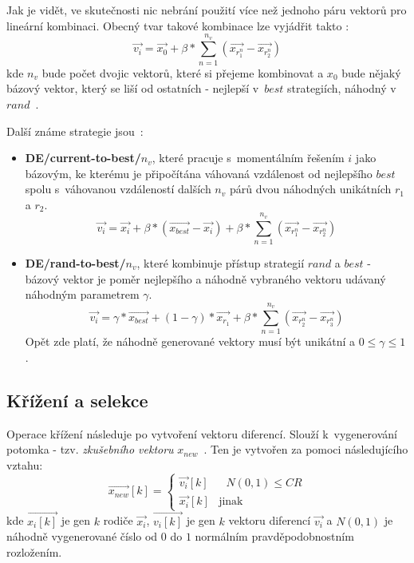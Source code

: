 \noindent Jak je vidět, ve skutečnosti nic nebrání použití více než jednoho páru vektorů pro lineární kombinaci. Obecný tvar takové kombinace lze vyjádřit takto : 
 \begin{equation}
    \Vec{v_i} = \Vec{x_0} + \beta * \sum_{n=1}^{n_v}(\Vec{x_{r_{1}^{n}}} - \Vec{x_{r_{2}^{n}}})
    \label{eq:de_rand_2}
    \end{equation} 
kde $n_v$ bude počet dvojic vektorů, které si přejeme kombinovat a $x_0$ bude nějaký bázový vektor, který se liší od ostatních - nejlepší v~$best$ strategiích, náhodný v~$rand$~\cite{Weisser2010}.

Další známe strategie jsou~\cite{Weisser2010}:
\begin{itemize}
    \item \textbf{DE/current-to-best/$n_{v}$}, které pracuje s~momentálním řešením $i$ jako bázovým, ke kterému je připočítána váhovaná vzdálenost od nejlepšího $best$ spolu s~váhovanou vzdáleností dalších $n_v$ párů dvou náhodných unikátních $r_1$ a $r_2$.
     \begin{equation}
    \Vec{v_i} = \Vec{x_i} +  \beta * (\Vec{x_{best}} - \Vec{x_{i}}) + \beta * \sum_{n=1}^{n_v}(\Vec{x_{r_{1}^{n}}} - \Vec{x_{r_{2}^{n}}})
    \label{eq:de_rand_2}
    \end{equation} 
    \item \textbf{DE/rand-to-best/$n_{v}$}, které kombinuje přístup strategií $rand$ a $best$ - bázový vektor je poměr nejlepšího a náhodně vybraného vektoru udávaný náhodným parametrem $\gamma$.
     \begin{equation}
    \Vec{v_i} = \gamma * \Vec{x_{best}} + (1 - \gamma) * \Vec{x_{r_1}}  + \beta * \sum_{n=1}^{n_v}(\Vec{x_{r_{2}^{n}}} - \Vec{x_{r_{3}^{n}}})
    \label{eq:de_rand_2}
    \end{equation} 
    Opět zde platí, že náhodně generované vektory musí být unikátní a $0 \leq \gamma \leq 1$.
\end{itemize}


\subsection{Křížení a selekce}
Operace křížení následuje po vytvoření vektoru diferencí. Slouží k~vygenerování potomka - tzv. \textit{zkušebního vektoru} $x_{new}$~\cite{Weisser2010}. Ten je vytvořen za pomoci následujícího vztahu: 
     \begin{equation}
    \Vec{x_{new}}[k] = \begin{cases}
    \Vec{v_{i}}[k] & \text{ $N(0,1) \le CR$}\\
    \Vec{x_{i}}[k] &\text{jinak}
    \end{cases}
    \label{eq:de_rand_2}
    \end{equation} 
kde $\Vec{x_i[k]}$ je gen $k$ rodiče $\Vec{x_i}$, $\Vec{v_i[k]}$ je gen $k$ vektoru diferencí $\Vec{v_i}$ a $N(0,1)$ je náhodně vygenerované číslo od $0$ do $1$ normálním pravděpodobnostním rozložením.

